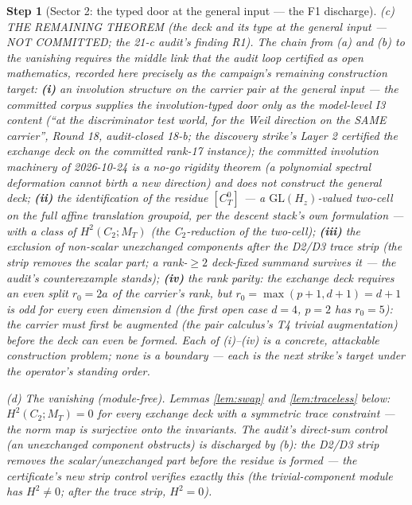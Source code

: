 \documentclass[11pt]{article}
\newtheorem{step}{Step}
\begin{document}
\begin{step}[Sector 2: the typed door at the general input --- the F1
discharge]
\emph{(c) THE REMAINING THEOREM (the deck and its type at the general
input --- NOT COMMITTED; the 21-c audit's finding R1).} The chain from (a)
and (b) to the vanishing requires the middle link that the audit loop
certified as open mathematics, recorded here precisely as the campaign's
remaining construction target: \textbf{(i)} an involution structure on the
carrier pair at the general input --- the committed corpus supplies the
involution-typed door only as the model-level I3 content (``at the
discriminator test world, for the Weil direction on the SAME carrier'',
Round 18, audit-closed 18-b; the discovery strike's Layer 2 certified the
exchange deck on the committed rank-17 instance); the committed involution
machinery of 2026-10-24 is a \emph{no-go} rigidity theorem (a polynomial
spectral deformation cannot birth a new direction) and does not construct
the general deck; \textbf{(ii)} the identification of the residue
$[C_T^0]$ --- a $\mathrm{GL}(H_z)$-valued two-cell on the full affine
translation groupoid, per the descent stack's own formulation --- with a
class of $H^2(C_2; M_T)$ (the C$_2$-reduction of the two-cell); \textbf{(iii)}
the exclusion of non-scalar unexchanged components after the D2/D3 trace
strip (the strip removes the scalar part; a rank-$\ge 2$ deck-fixed
summand survives it --- the audit's counterexample stands); \textbf{(iv)}
the rank parity: the exchange deck requires an even split $r_0 = 2a$ of
the carrier's rank, but $r_0 = \max(p+1, d+1) = d+1$ is \emph{odd} for
every even dimension $d$ (the first open case $d = 4$, $p = 2$ has
$r_0 = 5$): the carrier must first be augmented (the pair calculus's T4
trivial augmentation) before the deck can even be formed. Each of (i)--(iv)
is a concrete, attackable construction problem; none is a boundary --- each
is the next strike's target under the operator's standing order.

\emph{(d) The vanishing (module-free).} Lemmas \ref{lem:swap} and
\ref{lem:traceless} below: $H^2(C_2; M_T) = 0$ for every exchange deck with
a symmetric trace constraint --- the norm map is surjective onto the
invariants. The audit's direct-sum control (an unexchanged component
obstructs) is discharged by (b): the D2/D3 strip \emph{removes} the
scalar/unexchanged part before the residue is formed --- the certificate's
new strip control verifies exactly this (the trivial-component module has
$H^2 \ne 0$; after the trace strip, $H^2 = 0$).


\end{step}
\end{document}
